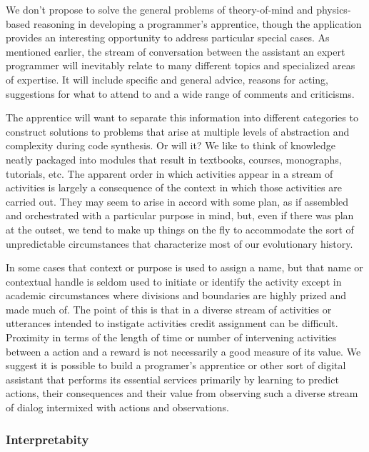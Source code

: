 
We don't propose to solve the general problems of theory-of-mind and physics-based reasoning in developing a programmer's apprentice, though the application provides an interesting opportunity to address particular special cases. As mentioned earlier, the stream of conversation between the assistant an expert programmer will inevitably relate to many different topics and specialized areas of expertise. It will include specific and general advice, reasons for acting, suggestions for what to attend to and a wide range of comments and criticisms. 

The apprentice will want to separate this information into different categories to construct solutions to problems that arise at multiple levels of abstraction and complexity during code synthesis. Or will it? We like to think of knowledge neatly packaged into modules that result in textbooks, courses, monographs, tutorials, etc. The apparent order in which activities appear in a stream of activities is largely a consequence of the context in which those activities are carried out. They may seem to arise in accord with some plan, as if assembled and orchestrated with a particular purpose in mind, but, even if there was plan at the outset, we tend to make up things on the fly to accommodate the sort of unpredictable circumstances that characterize most of our evolutionary history. 

In some cases that context or purpose is used to assign a name, but that name or contextual handle is seldom used to initiate or identify the activity except in academic circumstances where divisions and boundaries are highly prized and made much of. The point of this is that in a diverse stream of activities \emdash{} or utterances intended to instigate activities \emdash{} credit assignment can be difficult. Proximity in terms of the length of time or number of intervening activities between a action and a reward is not necessarily a good measure of its value. We suggest it is possible to build a programer's apprentice or other sort of digital assistant that performs its essential services primarily by learning to predict actions, their consequences and their value from observing such a diverse stream of dialog intermixed with actions and observations. 


\subsubsection*{Interpretabity}

